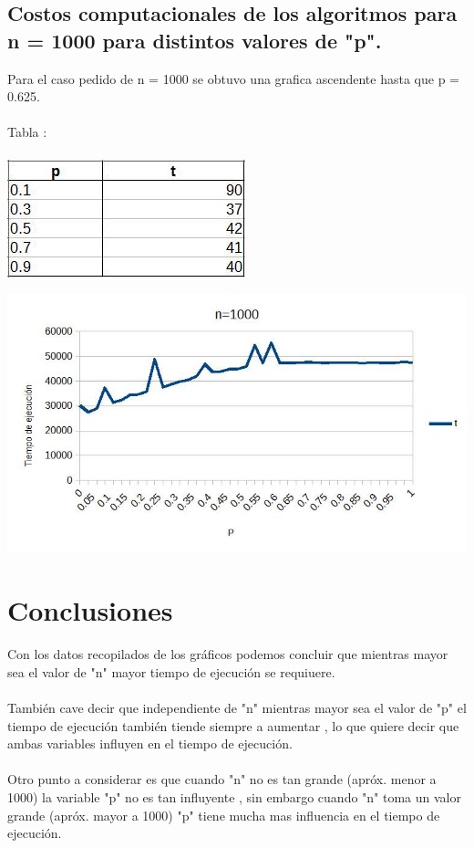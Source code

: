 \documentclass[12pt,letterpaper]{scrartcl}
\begin{document}
\subsection{Costos computacionales de los algoritmos para n = 1000 para distintos valores de "p".}

Para el caso pedido de n = 1000 se obtuvo una grafica ascendente hasta que p = 0.625.
\\\\
Tabla :
\\\\
\includegraphics[scale=0.45]{4}

\includegraphics[scale=0.55]{nnn}
\newpage

\section{Conclusiones}

Con los datos recopilados de los gráficos podemos concluir que mientras mayor sea el valor de "n" mayor tiempo de ejecución se requiuere.
\\\\
También cave decir que independiente de "n" mientras mayor sea el valor de "p" el tiempo de ejecución también tiende siempre a aumentar , lo que quiere decir que ambas variables influyen en el tiempo de ejecución.
\\\\
Otro punto a considerar es que cuando "n" no es tan grande (apróx. menor a 1000) la variable "p" no es tan influyente , sin embargo cuando "n" toma un valor grande (apróx. mayor a 1000) "p" tiene mucha mas influencia en el tiempo de ejecución.
\end{document}
